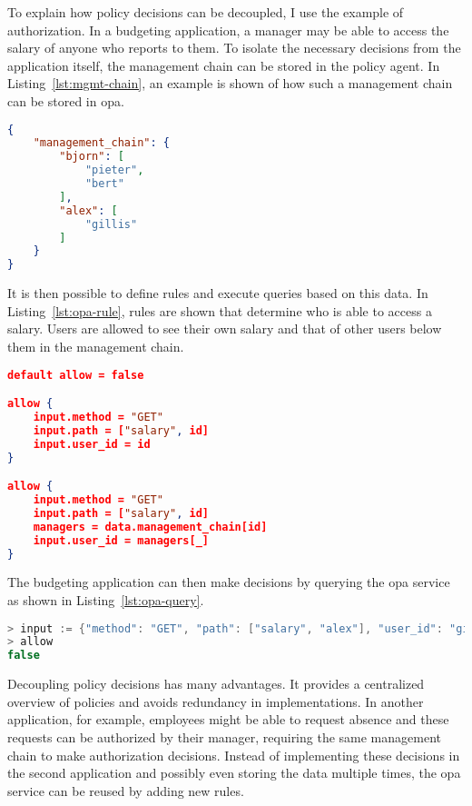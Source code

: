 To explain how policy decisions can be decoupled, I use the example of authorization.
In a budgeting application, a manager may be able to access the salary of anyone who reports to them.
To isolate the necessary decisions from the application itself, the management chain can be stored in the policy agent.
In Listing~\ref{lst:mgmt-chain}, an example is shown of how such a management chain can be stored in \gls{opa}.

\begin{lstlisting}[language={json},caption={Management chain data example for use in OPA.},label={lst:mgmt-chain},xleftmargin=15pt,float]
{
    "management_chain": {
        "bjorn": [
            "pieter",
            "bert"
        ],
        "alex": [
            "gillis"
        ]
    }
}
\end{lstlisting}

It is then possible to define rules and execute queries based on this data.
In Listing~\ref{lst:opa-rule}, rules are shown that determine who is able to access a salary.
Users are allowed to see their own salary and that of other users below them in the management chain.

\begin{lstlisting}[language={json},caption={OPA rules that define who has access to the salary of other users.},label={lst:opa-rule},xleftmargin=15pt,float]
default allow = false

allow {
    input.method = "GET"
    input.path = ["salary", id]
    input.user_id = id
}

allow {
    input.method = "GET"
    input.path = ["salary", id]
    managers = data.management_chain[id]
    input.user_id = managers[_]
}
\end{lstlisting}

The budgeting application can then make decisions by querying the \gls{opa} service as shown in Listing~\ref{lst:opa-query}.

\begin{lstlisting}[language={java},caption={Management chain data example for use in OPA.},label={lst:opa-query},xleftmargin=15pt,float]
> input := {"method": "GET", "path": ["salary", "alex"], "user_id": "gillis"}
> allow
false
\end{lstlisting}

Decoupling policy decisions has many advantages.
It provides a centralized overview of policies and avoids redundancy in implementations.
In another application, for example, employees might be able to request absence and these requests can be authorized by their manager, requiring the same management chain to make authorization decisions.
Instead of implementing these decisions in the second application and possibly even storing the data multiple times, the \gls{opa} service can be reused by adding new rules.


